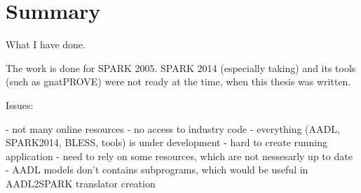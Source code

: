 
\cleardoublepage

\chapter{Summary}
\label{summary}

What I have done.

The work is done for SPARK 2005. SPARK 2014 (especially taking) and its tools (such as gnatPROVE) were not ready at the time, when this thesis was written.

Issues:

- not many online resources
- no access to industry code
- everything (AADL, SPARK2014, BLESS, tools) is under development
- hard to create running application
- need to rely on some resources, which are not nessesarly up to date
- AADL models don't contains subprograms, which would be useful in AADL2SPARK translator creation